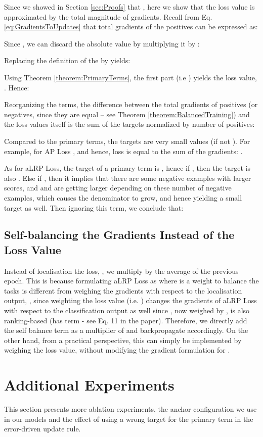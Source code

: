 \documentclass{article}
\begin{document}
Since we showed in Section \ref{sec:Proofs} that , here we show that the loss value is approximated by the total magnitude of gradients. Recall from Eq. \eqref{eq:GradientsToUpdates} that total gradients of the positives can be expressed as:

Since , we can discard the absolute value by multiplying it by :

Replacing the definition of the  by  yields:

Using Theorem \ref{theorem:PrimaryTerms}, the first part (i.e ) yields the loss value, .  Hence:

Reorganizing the terms, the difference between the total gradients of positives (or negatives, since they are equal -- see Theorem \ref{theorem:BalancedTraining}) and the loss values itself is the sum of the targets normalized by number of positives:

Compared to the primary terms, the targets are very small values (if not ). For example, for AP Loss , and hence, loss is  equal to the sum of the gradients: .

As for aLRP Loss, the target of a primary term is , hence if , then the target is also . Else if , then it implies that there are some negative examples with larger scores, and  and  are getting larger depending on these number of negative examples, which causes the denominator to grow, and hence  yielding a small target as well. Then ignoring this term, we conclude that:


\subsection{Self-balancing the Gradients Instead of the Loss Value}
Instead of localisation the loss, , we multiply  by the average  of the previous epoch. This is because formulating aLRP Loss as  where  is a weight to balance the tasks is different from weighing the gradients with respect to the localisation output, , since weighting the loss value (i.e. ) changes the gradients of aLRP Loss with respect to the classification output as well since , now weighed by , is also ranking-based (has  term - see Eq. 11 in the paper). Therefore, we directly add the self balance term as a multiplier of  and backpropagate accordingly. On the other hand, from a practical perspective, this can simply be implemented by weighing the loss value,  without modifying the gradient formulation for .
 \section{Additional Experiments}
This section presents more ablation experiments, the anchor configuration we use in our models and the effect of using a wrong target for the primary term in the error-driven update rule.
\end{document}
